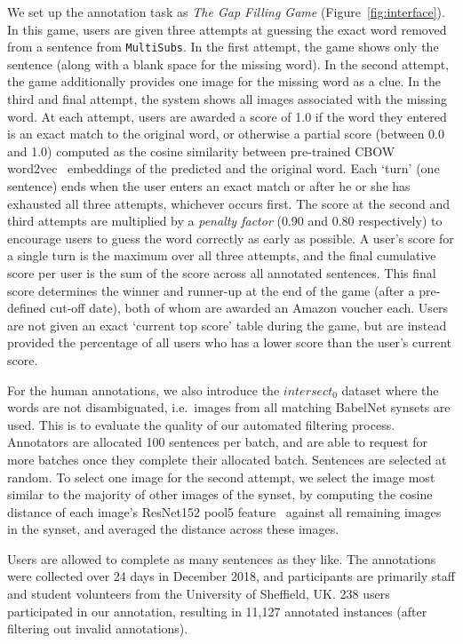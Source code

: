 \documentclass[twocolumn]{svjour3}          \smartqed  \usepackage{graphicx}
\newcommand{\multisubs}{\texttt{MultiSubs}\xspace}
\begin{document}
We set up the annotation task as \textit{The Gap Filling Game} (Figure~\ref{fig:interface}). In this game, users are given three attempts at guessing the exact word removed from a sentence from \multisubs. In the first attempt, the game shows only the sentence (along with a blank space for the missing word). In the second attempt, the game additionally provides one image for the missing word as a clue. In the third and final attempt, the system shows all images associated with the missing word. At each attempt, users are awarded a score of 1.0 if the word they entered is an exact match to the original word, or otherwise a partial score (between 0.0 and 1.0) computed as the cosine similarity between pre-trained CBOW word2vec~\cite{MikolovEtAl:2013} embeddings of the predicted and the original word. Each `turn' (one sentence) ends when the user enters an exact match or after he or she has exhausted all three attempts, whichever occurs first. The score at the second and third attempts are multiplied by a \emph{penalty factor} (0.90 and 0.80 respectively) to encourage users to guess the word correctly as early as possible. A user's score for a single turn is the maximum over all three attempts, and the final cumulative score per user is the sum of the score across all annotated sentences. This final score determines the winner and runner-up at the end of the game (after a pre-defined cut-off date), both of whom are awarded an Amazon voucher each. Users are not given an exact `current top score' table during the game, but are instead provided the percentage of all users who has a lower score than the user's current score.

For the human annotations, we also introduce the \textbf{$intersect_0$} dataset where the words are not disambiguated, i.e.\ images from all matching BabelNet synsets are used. This is to evaluate the quality of our automated filtering process. Annotators are allocated 100 sentences per batch, and are able to request for more batches once they complete their allocated batch. Sentences are selected at random. To select one image for the second attempt, we select the image most similar to the majority of other images of the synset, by computing the cosine distance of each image's ResNet152 pool5 feature~\cite{HeEtAl:2016} against all remaining images in the synset, and averaged the distance across these images. 

Users are allowed to complete as many sentences as they like. The annotations were collected over 24 days in December 2018, and participants are primarily staff and student volunteers from the University of Sheffield, UK. 238 users participated in our annotation, resulting in 11,127 annotated instances (after filtering out invalid annotations).
\end{document}
